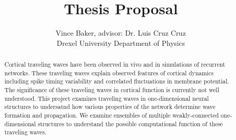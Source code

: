 \documentclass[a4paper,11pt]{article}
\title{Thesis Proposal}
\author{Vince Baker, advisor: Dr. Luis Cruz Cruz\\ Drexel University Department of Physics}
\begin{document}
\maketitle

\begin{abstract}
Cortical traveling waves have been observed in vivo and in simulations of recurrent networks.
These traveling waves explain observed features of cortical dynamics including spike timing variability and correlated fluctuations in membrane potential.
The significance of these traveling waves in cortical function is currently not well understood.
This project examines traveling waves in one-dimensional neural structures to undersatnd how various properties of the network determine wave formation and propagation.
We examine ensembles of multiple weakly-connected one-dimensional structures to understand the possible computational function of these traveling waves.
\end{abstract}
\end{document}
